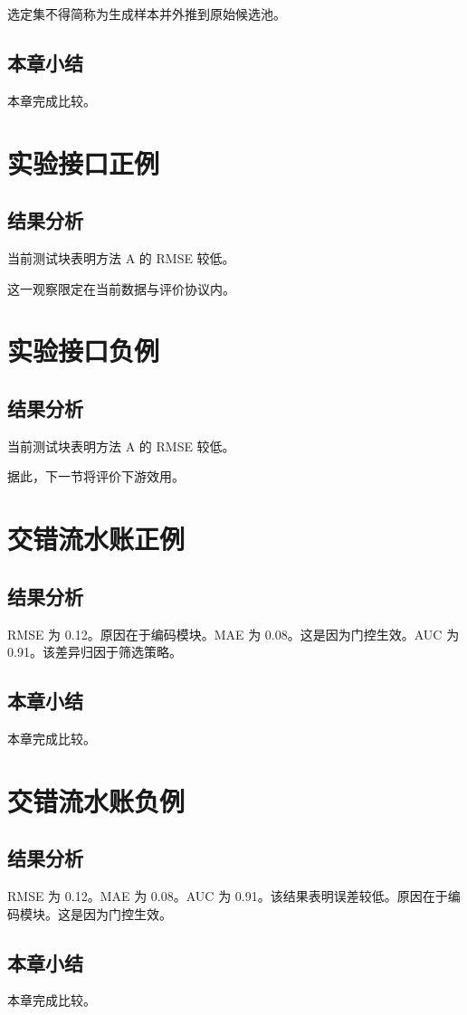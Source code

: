 选定集不得简称为生成样本并外推到原始候选池。
\section{本章小结}
本章完成比较。

\chapter{实验接口正例}
\section{结果分析}
当前测试块表明方法 A 的 RMSE 较低。

这一观察限定在当前数据与评价协议内。

\chapter{实验接口负例}
\section{结果分析}
当前测试块表明方法 A 的 RMSE 较低。

据此，下一节将评价下游效用。

\chapter{交错流水账正例}
\section{结果分析}
RMSE 为 0.12。原因在于编码模块。MAE 为 0.08。这是因为门控生效。AUC 为 0.91。该差异归因于筛选策略。
\section{本章小结}
本章完成比较。

\chapter{交错流水账负例}
\section{结果分析}
RMSE 为 0.12。MAE 为 0.08。AUC 为 0.91。该结果表明误差较低。原因在于编码模块。这是因为门控生效。
\section{本章小结}
本章完成比较。

